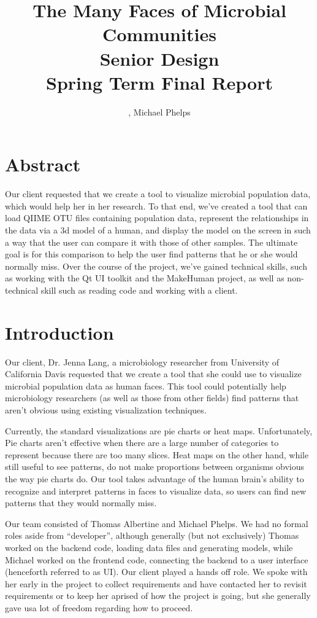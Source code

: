 \documentclass[letterpaper,10pt, onecolumn, draftclsnofoot]{IEEEtran}
\title{The Many Faces of Microbial Communities \\\large Senior Design\\Spring Term Final Report\\}
\author{\name, Michael Phelps}
\begin{document}
\maketitle
\section{Abstract}

Our client requested that we create a tool to visualize microbial population data, which would help her in her research. To that end, we've created a tool that can load QIIME OTU files containing population data, represent the relationships in the data via a 3d model of a human, and display the model on the screen in such a way that the user can compare it with those of other samples. The ultimate goal is for this comparison to help the user find patterns that he or she would normally miss. Over the course of the project, we've gained technical skills, such as working with the Qt UI toolkit and the MakeHuman project, as well as non-technical skill such as reading code and working with a client.

\clearpage

\tableofcontents

\section{Introduction}
Our client, Dr. Jenna Lang, a microbiology researcher from University of California Davis requested that we create a tool that she could use to visualize microbial population data as human faces. This tool could potentially help microbiology researchers (as well as those from other fields) find patterns that aren't obvious using existing visualization techniques. 

Currently, the standard visualizations are pie charts or heat maps. Unfortunately, Pie charts aren't effective when there are a large number of categories to represent because there are too many slices. Heat maps on the other hand, while still useful to see patterns, do not make proportions between organisms obvious the way pie charts do. Our tool takes advantage of the human brain's ability to recognize and interpret patterns in faces to visualize data, so users can find new patterns that they would normally miss.

Our team consisted of Thomas Albertine and Michael Phelps. We had no formal roles aside from ``developer'', although generally (but not exclusively) Thomas worked on the backend code, loading data files and generating models, while Michael worked on the frontend code, connecting the backend to a user interface (henceforth referred to as UI). Our client played a hands off role. We spoke with her early in the project to collect requirements and have contacted her to revisit requirements or to keep her aprised of how the project is going, but she generally gave usa lot of freedom regarding how to proceed.
\end{document}
